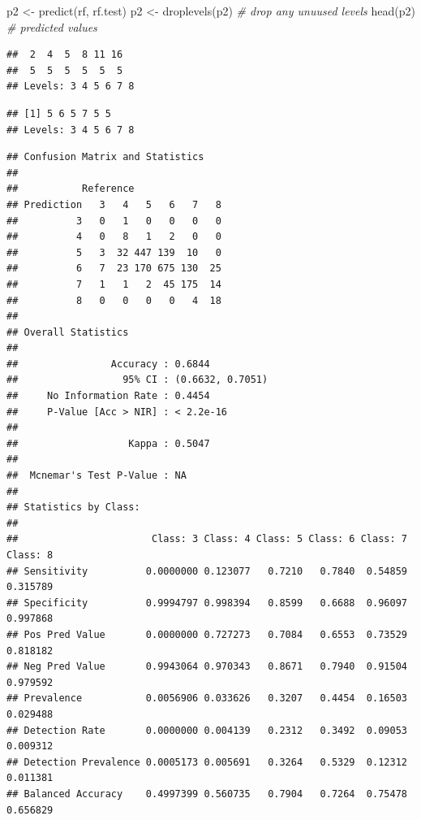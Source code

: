 \documentclass[
]{book}
\newenvironment{Shaded}{\begin{snugshade}}{\end{snugshade}}
\newcommand{\CommentTok}[1]{\textcolor[rgb]{0.56,0.35,0.01}{\textit{#1}}}
\newcommand{\FunctionTok}[1]{\textcolor[rgb]{0.00,0.00,0.00}{#1}}
\newcommand{\NormalTok}[1]{#1}
\newcommand{\OtherTok}[1]{\textcolor[rgb]{0.56,0.35,0.01}{#1}}
\newcommand{\SpecialCharTok}[1]{\textcolor[rgb]{0.00,0.00,0.00}{#1}}
\begin{document}
\begin{Shaded}
\begin{Highlighting}[]
\NormalTok{p2 }\OtherTok{\textless{}{-}} \FunctionTok{predict}\NormalTok{(rf, rf.test)}
\NormalTok{p2 }\OtherTok{\textless{}{-}} \FunctionTok{droplevels}\NormalTok{(p2) }\CommentTok{\# drop any unuused levels }
\FunctionTok{head}\NormalTok{(p2) }\CommentTok{\# predicted values}
\end{Highlighting}
\end{Shaded}

\begin{verbatim}
##  2  4  5  8 11 16 
##  5  5  5  5  5  5 
## Levels: 3 4 5 6 7 8
\end{verbatim}

\begin{Shaded}
\end{Shaded}

\begin{verbatim}
## [1] 5 6 5 7 5 5
## Levels: 3 4 5 6 7 8
\end{verbatim}

\begin{Shaded}
\end{Shaded}

\begin{verbatim}
## Confusion Matrix and Statistics
## 
##           Reference
## Prediction   3   4   5   6   7   8
##          3   0   1   0   0   0   0
##          4   0   8   1   2   0   0
##          5   3  32 447 139  10   0
##          6   7  23 170 675 130  25
##          7   1   1   2  45 175  14
##          8   0   0   0   0   4  18
## 
## Overall Statistics
##                                           
##                Accuracy : 0.6844          
##                  95% CI : (0.6632, 0.7051)
##     No Information Rate : 0.4454          
##     P-Value [Acc > NIR] : < 2.2e-16       
##                                           
##                   Kappa : 0.5047          
##                                           
##  Mcnemar's Test P-Value : NA              
## 
## Statistics by Class:
## 
##                       Class: 3 Class: 4 Class: 5 Class: 6 Class: 7 Class: 8
## Sensitivity          0.0000000 0.123077   0.7210   0.7840  0.54859 0.315789
## Specificity          0.9994797 0.998394   0.8599   0.6688  0.96097 0.997868
## Pos Pred Value       0.0000000 0.727273   0.7084   0.6553  0.73529 0.818182
## Neg Pred Value       0.9943064 0.970343   0.8671   0.7940  0.91504 0.979592
## Prevalence           0.0056906 0.033626   0.3207   0.4454  0.16503 0.029488
## Detection Rate       0.0000000 0.004139   0.2312   0.3492  0.09053 0.009312
## Detection Prevalence 0.0005173 0.005691   0.3264   0.5329  0.12312 0.011381
## Balanced Accuracy    0.4997399 0.560735   0.7904   0.7264  0.75478 0.656829
\end{verbatim}
\end{document}
